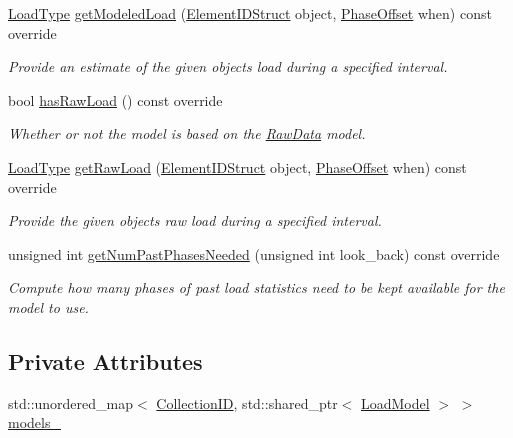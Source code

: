 \begin{DoxyCompactItemize}
\hyperlink{namespacevt_a8fb51741340b87d7aaee0bef60e9896b}{Load\+Type} \hyperlink{structvt_1_1vrt_1_1collection_1_1balance_1_1_per_collection_ad790d560d64515d28c6914f26fbe177c}{get\+Modeled\+Load} (\hyperlink{namespacevt_1_1vrt_1_1collection_1_1balance_a9f5b53fafb270212279a4757d2c4cd28}{Element\+I\+D\+Struct} object, \hyperlink{structvt_1_1vrt_1_1collection_1_1balance_1_1_phase_offset}{Phase\+Offset} when) const override
\begin{DoxyCompactList}\small\item\em Provide an estimate of the given object\textquotesingle{}s load during a specified interval. \end{DoxyCompactList}\item 
bool \hyperlink{structvt_1_1vrt_1_1collection_1_1balance_1_1_per_collection_a82a94bbf8764a3c6bd346e4a686e1efb}{has\+Raw\+Load} () const override
\begin{DoxyCompactList}\small\item\em Whether or not the model is based on the \hyperlink{structvt_1_1vrt_1_1collection_1_1balance_1_1_raw_data}{Raw\+Data} model. \end{DoxyCompactList}\item 
\hyperlink{namespacevt_a8fb51741340b87d7aaee0bef60e9896b}{Load\+Type} \hyperlink{structvt_1_1vrt_1_1collection_1_1balance_1_1_per_collection_aed857aa2da3e7dc339236a1953b9747a}{get\+Raw\+Load} (\hyperlink{namespacevt_1_1vrt_1_1collection_1_1balance_a9f5b53fafb270212279a4757d2c4cd28}{Element\+I\+D\+Struct} object, \hyperlink{structvt_1_1vrt_1_1collection_1_1balance_1_1_phase_offset}{Phase\+Offset} when) const override
\begin{DoxyCompactList}\small\item\em Provide the given object\textquotesingle{}s raw load during a specified interval. \end{DoxyCompactList}\item 
unsigned int \hyperlink{structvt_1_1vrt_1_1collection_1_1balance_1_1_per_collection_ad71f5405a169c5fe2a25668df96c3a7c}{get\+Num\+Past\+Phases\+Needed} (unsigned int look\+\_\+back) const override
\begin{DoxyCompactList}\small\item\em Compute how many phases of past load statistics need to be kept available for the model to use. \end{DoxyCompactList}\end{DoxyCompactItemize}
\subsection*{Private Attributes}
\begin{DoxyCompactItemize}
\item 
std\+::unordered\+\_\+map$<$ \hyperlink{structvt_1_1vrt_1_1collection_1_1balance_1_1_per_collection_ade08a6857f727a0a9d1ef63b25fc5b71}{Collection\+ID}, std\+::shared\+\_\+ptr$<$ \hyperlink{structvt_1_1vrt_1_1collection_1_1balance_1_1_load_model}{Load\+Model} $>$ $>$ \hyperlink{structvt_1_1vrt_1_1collection_1_1balance_1_1_per_collection_aec76660b4a44fe451a9546b4f4c50d3d}{models\+\_\+}
\end{DoxyCompactItemize}


